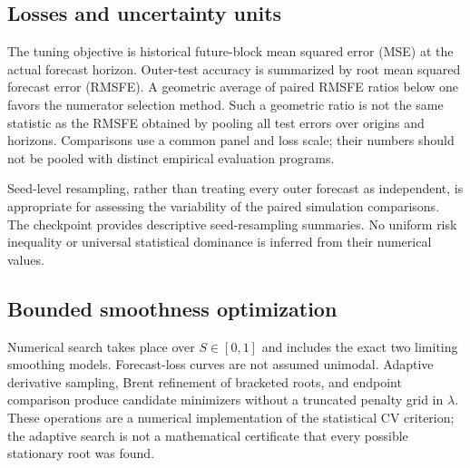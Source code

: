 \subsection{Losses and uncertainty units}

The tuning objective is historical
future-block mean squared error (MSE)
at the actual forecast horizon.
Outer-test accuracy is summarized by
root mean squared forecast error (RMSFE).
A geometric average of paired RMSFE
ratios below one favors the numerator
selection method. Such a geometric ratio
is not the same statistic as the
RMSFE obtained by pooling all test
errors over origins and horizons.
Comparisons use a common panel and
loss scale; their numbers should
not be pooled with distinct empirical
evaluation programs.

Seed-level resampling, rather than
treating every outer forecast as
independent, is appropriate for assessing
the variability of the paired
simulation comparisons. The checkpoint
provides descriptive seed-resampling
summaries. No uniform risk inequality
or universal statistical dominance
is inferred from their numerical values.

\subsection{Bounded smoothness optimization}

Numerical search takes place over
$S\in[0,1]$ and includes the
exact two limiting smoothing models.
Forecast-loss curves are not assumed
unimodal. Adaptive derivative sampling,
Brent refinement of bracketed roots,
and endpoint comparison produce
candidate minimizers without a
truncated penalty grid in $\lambda$.
These operations are a numerical
implementation of the statistical CV
criterion; the adaptive search is not
a mathematical certificate that every
possible stationary root was found.
